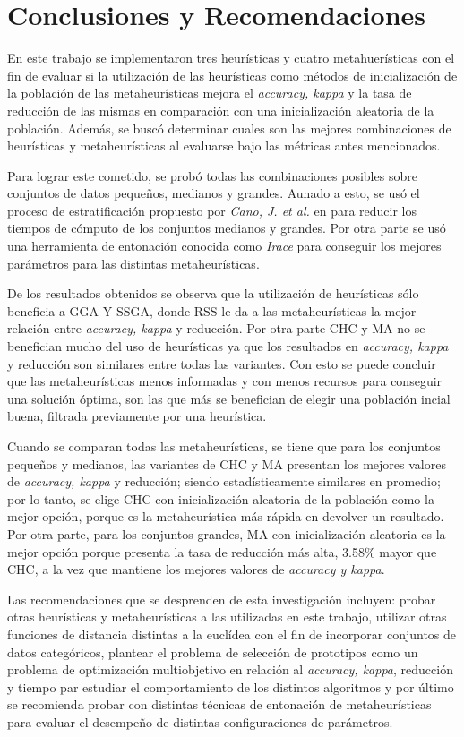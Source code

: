 \chapter*{Conclusiones y Recomendaciones}
\label{conclusiones}

En este trabajo se implementaron tres heurísticas y cuatro metahuerísticas con el fin de evaluar si la utilización de las heurísticas como métodos de inicialización de la población de las metaheurísticas mejora el \emph{accuracy, kappa} y la tasa de reducción de las mismas en comparación con una inicialización aleatoria de la población. Además, se buscó determinar cuales son las mejores combinaciones de heurísticas y metaheurísticas al evaluarse bajo las métricas antes mencionados.

Para lograr este cometido, se probó todas las combinaciones posibles sobre conjuntos de datos pequeños, medianos y grandes. Aunado a esto, se usó el proceso de estratificación propuesto por \emph{Cano, J. et al.} en \cite{cano2005stratification} para reducir los tiempos de cómputo de los conjuntos medianos y grandes. Por otra parte se usó una herramienta de entonación conocida como \emph{Irace} para conseguir los mejores parámetros para las distintas metaheurísticas.

De los resultados obtenidos se observa que la utilización de heurísticas sólo beneficia a GGA Y SSGA, donde  RSS le da a las metaheurísticas la mejor relación entre \emph{accuracy, kappa} y reducción. Por otra parte CHC y MA no se benefician mucho del uso de heurísticas ya que los resultados en \emph{accuracy, kappa} y reducción son similares entre todas las variantes. Con esto se puede concluir que las metaheurísticas menos informadas y con menos recursos para conseguir una solución óptima, son las que más se benefician de elegir una población incial buena, filtrada previamente por una heurística.

 Cuando se comparan todas las metaheurísticas, se tiene que para los conjuntos pequeños y medianos, las variantes de CHC y MA presentan los mejores valores de \emph{accuracy, kappa} y reducción; siendo estadísticamente similares en promedio; por lo tanto, se elige CHC con inicialización aleatoria de la población como la mejor opción, porque es la metaheurística más rápida en devolver un resultado. Por otra parte, para los conjuntos grandes, MA con inicialización aleatoria es la mejor opción porque presenta la tasa de reducción más alta, 3.58\% mayor que CHC, a la vez que mantiene los mejores valores de \emph{accuracy y kappa}.

Las recomendaciones que se desprenden de esta investigación incluyen: probar otras heurísticas y metaheurísticas a las utilizadas en este trabajo, utilizar otras funciones de distancia distintas a la euclídea con el fin de incorporar conjuntos de datos categóricos, plantear el problema de selección de prototipos como un problema de optimización multiobjetivo en relación al \emph{accuracy, kappa}, reducción y tiempo par estudiar el comportamiento de los distintos algoritmos y por último se recomienda probar con distintas técnicas de entonación de metaheurísticas para evaluar el desempeño de distintas configuraciones de parámetros. 
